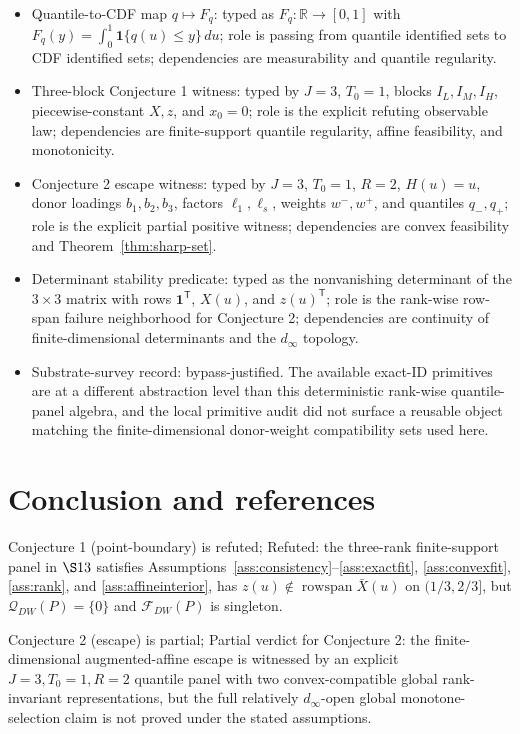 \documentclass[11pt]{article}
\newcommand{\one}{\mathbf{1}}
\newcommand{\transpose}{\mathsf{T}}
\newcommand{\R}{\mathbb{R}}
\theoremstyle{definition}
\theoremstyle{plain}
\theoremstyle{remark}
\begin{document}
\begin{itemize}[leftmargin=*]
\item Quantile-to-CDF map \(q\mapsto F_q\): typed as \(F_q:\R\to[0,1]\) with \(F_q(y)=\int_0^1\one\{q(u)\le y\}\,du\); role is passing from quantile identified sets to CDF identified sets; dependencies are measurability and quantile regularity.
\item Three-block Conjecture 1 witness: typed by \(J=3\), \(T_0=1\), blocks \(I_L,I_M,I_H\), piecewise-constant \(X,z\), and \(x_0=0\); role is the explicit refuting observable law; dependencies are finite-support quantile regularity, affine feasibility, and monotonicity.
\item Conjecture 2 escape witness: typed by \(J=3\), \(T_0=1\), \(R=2\), \(H(u)=u\), donor loadings \(b_1,b_2,b_3\), factors \(\ell_1,\ell_s\), weights \(w^-,w^+\), and quantiles \(q_-,q_+\); role is the explicit partial positive witness; dependencies are convex feasibility and Theorem~\ref{thm:sharp-set}.
\item Determinant stability predicate: typed as the nonvanishing determinant of the \(3\times3\) matrix with rows \(\one^\transpose\), \(X(u)\), and \(z(u)^\transpose\); role is the rank-wise row-span failure neighborhood for Conjecture 2; dependencies are continuity of finite-dimensional determinants and the \(d_\infty\) topology.
\item Substrate-survey record: bypass-justified.  The available exact-ID primitives are at a different abstraction level than this deterministic rank-wise quantile-panel algebra, and the local primitive audit did not surface a reusable object matching the finite-dimensional donor-weight compatibility sets used here.
\end{itemize}

\section{Conclusion and references}
Conjecture 1 (point-boundary) is refuted; Refuted: the three-rank finite-support panel in \(\S13\) satisfies Assumptions~\ref{ass:consistency}--\ref{ass:exactfit}, \ref{ass:convexfit}, \ref{ass:rank}, and \ref{ass:affineinterior}, has \(z(u)\notin\operatorname{rowspan}\bar X(u)\) on \((1/3,2/3]\), but \(\mathcal{Q}_{DW}(P)=\{0\}\) and \(\mathcal{F}_{DW}(P)\) is singleton.

Conjecture 2 (escape) is partial; Partial verdict for Conjecture 2: the finite-dimensional augmented-affine escape is witnessed by an explicit \(J=3,T_0=1,R=2\) quantile panel with two convex-compatible global rank-invariant representations, but the full relatively \(d_\infty\)-open global monotone-selection claim is not proved under the stated assumptions.
\end{document}
